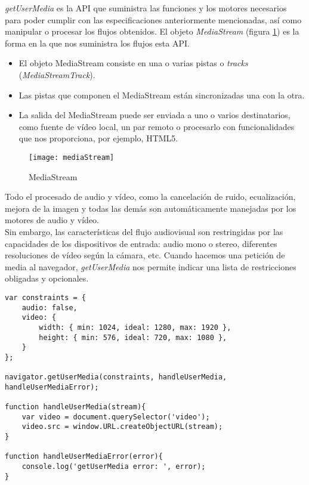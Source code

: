 \emph{getUserMedia} es la API que suministra las funciones y los motores necesarios para poder cumplir con las especificaciones anteriormente mencionadas, así como manipular o procesar los flujos obtenidos. El objeto \textit{MediaStream} (figura \ref{fig:mediaStream}) es la forma en la que nos suministra los flujos esta API.\\

\begin{itemize}
\item El objeto MediaStream consiste en una o varias pistas o \textit{tracks} (\textit{MediaStreamTrack}).
\item Las pistas que componen el MediaStream están sincronizadas una con la otra.
\item La salida del MediaStream puede ser enviada a uno o varios destinatarios, como fuente de vídeo local, un par remoto o procesarlo con funcionalidades que nos proporciona, por ejemplo, HTML5.
\end{itemize}

\begin{figure}[h!]
\centering
\texttt{[image: mediaStream]}
\caption{MediaStream}
\label{fig:mediaStream}
\end{figure}

Todo el procesado de audio y vídeo, como la cancelación de ruido, ecualización, mejora de la imagen y todas las demás son automáticamente manejadas por los motores de audio y vídeo.\\

Sin embargo, las características del flujo audiovisual son restringidas por las capacidades de los dispositivos de entrada: audio mono o stereo, diferentes resoluciones de vídeo según la cámara, etc. Cuando hacemos una petición de media al navegador, \emph{getUserMedia} nos permite indicar una lista de restricciones obligadas y opcionales.\\

\begin{lstlisting}[caption=Llamada a función RTCPeerConnection]
var constraints = {
    audio: false,
    video: {
        width: { min: 1024, ideal: 1280, max: 1920 },
        height: { min: 576, ideal: 720, max: 1080 },
    }
};

navigator.getUserMedia(constraints, handleUserMedia, handleUserMediaError); 

function handleUserMedia(stream){
    var video = document.querySelector('video');
    video.src = window.URL.createObjectURL(stream);
}

function handleUserMediaError(error){
	console.log('getUserMedia error: ', error);
}

\end{lstlisting}

